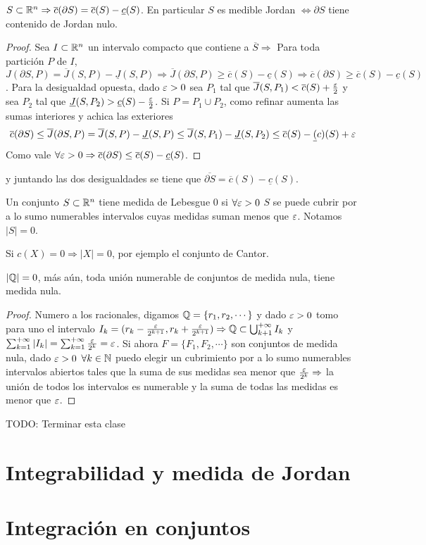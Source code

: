 \begin{theorem}
  $S \subset \mathbb{R}^n \Rightarrow \overline{c}(\partial S) = \overline{c}(S) - \underline{c}(S)$. En particular $S$ es medible Jordan $\iff \partial S$ tiene contenido de Jordan nulo.
  \begin{proof}
    Sea $I \subset \mathbb{R}^n$ un intervalo compacto que contiene a $\overline{S} \Rightarrow$ Para toda partición $P$ de $I$, $J(\partial S, P) = \overline{J}(S, P) - \underline{J}(S, P) \Rightarrow \overline{J}(\partial S, P) \geq \overline{c}(S) - \underline{c}(S) \Rightarrow \overline{c}(\partial S) \geq \overline{c}(S) - \underline{c}(S)$. Para la desigualdad opuesta, dado $\varepsilon > 0$ sea $P_1$ tal que $\overline{J}(S, P_1) < \overline{c}(S) + \frac{\varepsilon}{2}$ y sea $P_2$ tal que $\underline{J}(S, P_2) > \underline{c}(S) - \frac{\varepsilon}{2}$. Si $P = P_1 \cup P_2$, como refinar aumenta las sumas interiores y achica las exteriores \begin{align*}
      \overline{c}(\partial S) \leq \overline{J}(\partial S, P) = \overline{J}(S, P) - \underline{J}(S, P) \leq \overline{J}(S, P_1) - \underline{J}(S, P_2) \leq \overline{c}(S) - \underline(c)(S) + \varepsilon
    \end{align*}
    Como vale $\forall \varepsilon > 0 \Rightarrow \overline{c}(\partial S) \leq \overline{c}(S) - \underline{c}(S)$.
  \end{proof} y juntando las dos desigualdades se tiene que $\overline{\partial S} = \overline{c}(S) - \underline{c}(S)$.
\end{theorem}

\begin{definition}
  Un conjunto $S \subset \mathbb{R}^n$ tiene medida de Lebesgue $0$ si $\forall \varepsilon > 0$ $S$ se puede cubrir por a lo sumo numerables intervalos cuyas medidas suman menos que $\varepsilon$. Notamos $|S| = 0$.
\end{definition}

\begin{eg}
  Si $c(X) = 0 \Rightarrow |X| = 0$, por ejemplo el conjunto de Cantor.
\end{eg}

\begin{eg}
  $|\mathbb{Q}| = 0$, más aún, toda unión numerable de conjuntos de medida nula, tiene medida nula.
  \begin{proof}
    Numero a los racionales, digamos $\mathbb{Q} = \{r_1, r_2, \cdots\}$ y dado $\varepsilon > 0$ tomo para uno el intervalo $I_k = (r_k - \frac{\varepsilon}{2^{k+1}}, r_k + \frac{\varepsilon}{2^{k+1}}) \Rightarrow \mathbb{Q} \subset \bigcup_{k + 1}^{+\infty} I_k$ y $\sum_{k = 1}^{+\infty} |I_k| = \sum_{k = 1}^{+\infty} \frac{\varepsilon}{2^k} = \varepsilon$.
    Si ahora $F = \{F_1, F_2, \cdots\}$ son conjuntos de medida nula, dado $\varepsilon > 0$ $\forall k \in \mathbb{N}$ puedo elegir un cubrimiento por a lo sumo numerables intervalos abiertos tales que la suma de sus medidas sea menor que $\frac{\varepsilon}{2^k} \Rightarrow$ la unión de todos los intervalos es numerable y la suma de todas las medidas es menor que $\varepsilon$.
  \end{proof}
\end{eg}

TODO: Terminar esta clase
\section{Integrabilidad y medida de Jordan}

\section{Integración en conjuntos}
